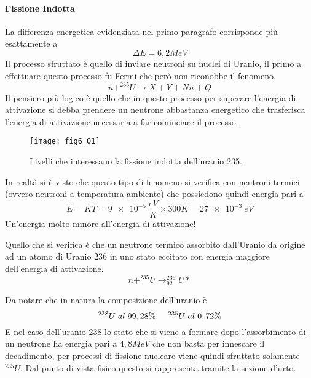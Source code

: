 \paragraph{Fissione Indotta}
La differenza energetica evidenziata nel primo paragrafo corrisponde più esattamente a 
\begin{equation}
\Delta E=6,2MeV
\end{equation}
Il processo sfruttato è quello di inviare neutroni su nuclei di Uranio, il primo a effettuare questo processo fu Fermi che però non riconobbe il fenomeno.
\begin{equation}
n+^{235}U\longrightarrow X+Y+Nn+Q
\end{equation}
Il pensiero più logico è quello che in questo processo per superare l'energia di attivazione si debba prendere un neutrone abbastanza energetico che trasferisca l'energia di attivazione necessaria a far cominciare il processo.
\begin{figure}[h]
\centering
\texttt{[image: fig6\_01]}
\caption{Livelli che interessano la fissione indotta dell'uranio 235.}
\end{figure}

In realtà si è visto che questo tipo di fenomeno si verifica con neutroni termici (ovvero neutroni a temperatura ambiente) che possiedono quindi energia pari a 
\begin{equation}
E=KT=\SI{9e-5}{\frac{eV}{K}}\times 300K=\SI{27e-3}{eV}
\end{equation}
Un'energia molto minore all'energia di attivazione!

Quello che si verifica è che un neutrone termico assorbito dall'Uranio da origine ad un atomo di Uranio 236 in uno stato eccitato con energia maggiore dell'energia di attivazione.
\begin{equation}
n+^{235}U\to ^{236}_{92}U*
\end{equation}

Da notare che in natura la composizione dell'uranio è
\[
^{238}U\hspace{0.1cm} al\hspace{0.1cm} 99,28\%\hspace{0.5cm}^{235}U\hspace{0.1cm} al\hspace{0.1cm} 0,72\%
\]
E nel caso dell'uranio 238 lo stato che si viene a formare dopo l'assorbimento di un neutrone ha energia pari a $4,8MeV$ che non basta per innescare il decadimento, per processi di fissione nucleare viene quindi sfruttato solamente $^{235}U$.
Dal punto di vista fisico questo si rappresenta tramite la sezione d'urto.

